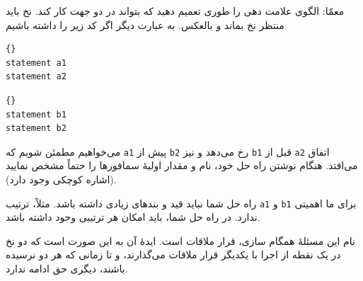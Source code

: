 \documentclass{book}
\newcommand{\clearemptydoublepage}{\newpage\cleardoublepage}
\begin{document}
معمّا: الگوی علامت دهی را طوری تعمیم دهید که بتواند در دو جهت کار کند. 
نخ  باید منتظر نخ  بماند و بالعکس. به عبارت دیگر اگر کد زیر را داشته باشیم

\begin{latin}
\begin{minipage}[t]{2in}
\begin{latin}
\begin{lstlisting}[title=\rl{نخ \lr{A}}]{}
statement a1
statement a2
\end{lstlisting}
\end{latin}
\end{minipage}
\hfill
\begin{minipage}[t]{2in}
\begin{latin}
\begin{lstlisting}[title=\rl{نخ \lr{B}}]{}
statement b1
statement b2
\end{lstlisting}
\end{latin}
\end{minipage}
\end{latin}

%
می‌خواهیم مطمئن شویم که \texttt{a1} پیش از \texttt{b2} رخ می‌دهد و نیز \texttt{b1} قبل از \texttt{a2} اتفاق می‌افتد. هنگام نوشتن راه حل خود، نام و مقدار اولیهٔ سمافورها را حتماً مشخص نمایید (اشاره کوچکی وجود دارد).

راه حل شما نباید قید و بندهای زیادی داشته باشد. مثلاً، ترتیب \texttt{a1} و \texttt{b1} برای ما اهمیتی ندارد. 
در راه حل شما، باید امکان هر ترتیبی وجود داشته باشد.

نام این مسئلهٔ همگام سازی، قرار ملاقات است. ایدهٔ آن به این صورت است که دو نخ در یک نقطه از اجرا با یکدیگر قرار ملاقات می‌گذارند، 
و تا زمانی که هر دو نرسیده باشند، دیگری حق ادامه ندارد.


 \clearemptydoublepage
\end{document}
